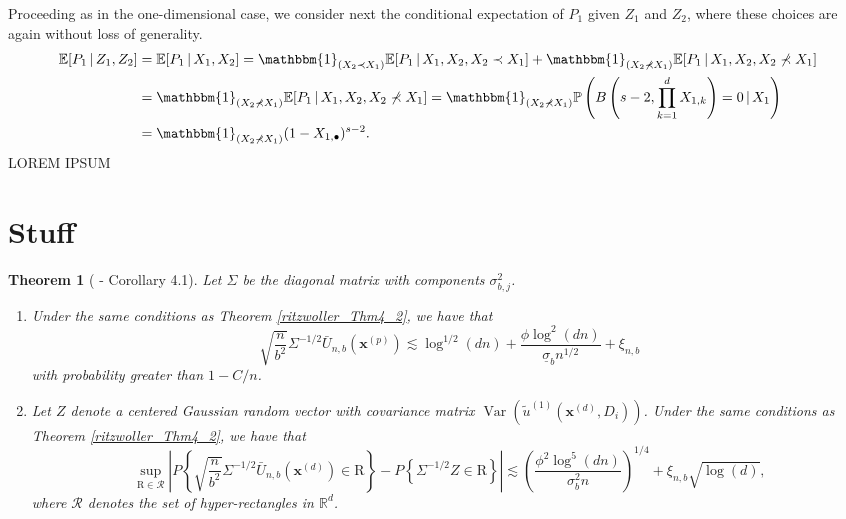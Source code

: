 \documentclass[letterpaper,10pt]{article}
\numberwithin{equation}{section}
\newtheorem{thm}{Theorem}
\numberwithin{thm}{section}
\numberwithin{lem}{section}
\numberwithin{cor}{section}
\newcommand{\1}{\mathbb{1}}
\begin{document}
Proceeding as in the one-dimensional case, we consider next the conditional expectation of $P_1$ given $Z_1$ and $Z_2$, where these choices are again without loss of generality.
\begin{equation*}
	\begin{aligned}
		\mathbb{E}[P_1 \, | \, Z_1, Z_2]
		 & = \mathbb{E}[P_1 \, | \, X_1, X_2]
		= \mathbbm{1}_{(X_2 \prec X_1)}\mathbb{E}[P_1 \, | \, X_1, X_2, X_2 \prec X_1] + \mathbbm{1}_{(X_2 \not\prec X_1)}\mathbb{E}[P_1 \, | \, X_1, X_2, X_2 \not\prec X_1] \\
		 & = \mathbbm{1}_{(X_2 \not\prec X_1)}\mathbb{E}[P_1 \, | \, X_1, X_2, X_2 \not\prec X_1]
		= \mathbbm{1}_{(X_2 \not\prec X_1)} \mathbb{P}\left(B\left(s - 2, \prod_{k = 1}^{d} X_{1,k}\right) = 0\, | \, X_1\right)                                              \\
		 & = \mathbbm{1}_{(X_2 \not\prec X_1)} (1- X_{1,\bullet})^{s-2}.
	\end{aligned}
\end{equation*}
{\color{red} LOREM IPSUM}

\section{Stuff}


\begin{thm}[\citet{ritzwoller_uniform_2024} - Corollary 4.1]
	Let $\Sigma$ be the diagonal matrix with components $\sigma_{b, j}^2$.
	\begin{enumerate}
		\item Under the same conditions as Theorem \ref{ritzwoller_Thm4_2}, we have that
		      \begin{equation}
			      \sqrt{\frac{n}{b^2}} \Sigma^{-1 / 2} \bar{U}_{n, b}\left(\mathbf{x}^{(p)}\right) \lesssim \log ^{1 / 2}(d n)+\frac{\phi \log ^2(d n)}{\underline{\sigma}_b n^{1 / 2}}+\xi_{n, b}
		      \end{equation}
		      with probability greater than $1-C / n$.
		\item Let $Z$ denote a centered Gaussian random vector with covariance matrix $\operatorname{Var}\left(\tilde{u}^{(1)}\left(\boldsymbol{x}^{(d)}, D_i\right)\right)$.
		      Under the same conditions as Theorem \ref{ritzwoller_Thm4_2}, we have that
		      \begin{equation}
			      \sup _{\mathrm{R} \in \mathcal{R}}\left|P\left\{\sqrt{\frac{n}{b^2}} \Sigma^{-1 / 2} \bar{U}_{n, b}\left(\boldsymbol{x}^{(d)}\right) \in \mathrm{R}\right\}-P\left\{\Sigma^{-1 / 2} Z \in \mathrm{R}\right\}\right|
			      \lesssim\left(\frac{\phi^2 \log ^5(d n)}{\sigma_b^2 n}\right)^{1 / 4}+\xi_{n, b} \sqrt{\log (d)},
		      \end{equation}
		      where $\mathcal{R}$ denotes the set of hyper-rectangles in $\mathbb{R}^d$.
	\end{enumerate}
\end{thm}
\end{document}
